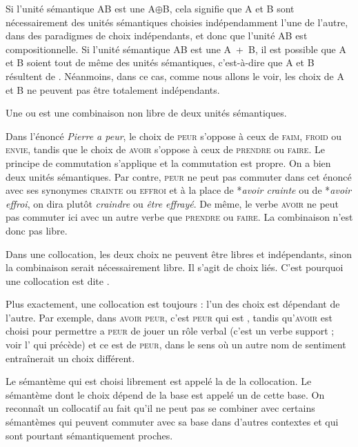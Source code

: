 Si l’unité sémantique AB est une  A${\oplus}$B, cela signifie que A et B sont nécessairement des unités sémantiques choisies indépendamment l’une de l’autre, dans des paradigmes de choix indépendants, et donc que l’unité AB est compositionnelle. Si l’unité sémantique AB est une  A~+~B, il est possible que A et B soient tout de même des unités sémantiques, c’est-à-dire que A et B résultent de . Néanmoins, dans ce cas, comme nous allons le voir, les choix de A et B ne peuvent pas être totalement indépendants.

{Une  ou  est une combinaison non libre de deux unités sémantiques.}

Dans l’énoncé \textit{Pierre a peur}, le choix de \textsc{peur} s’oppose à ceux de \textsc{faim,} \textsc{froid} ou \textsc{envie}, tandis que le choix de \textsc{avoir} s’oppose à ceux de \textsc{prendre} ou \textsc{faire}. Le principe de commutation s’applique et la commutation est propre. On a bien deux unités sémantiques. Par contre, \textsc{peur} ne peut pas commuter dans cet énoncé avec ses synonymes \textsc{crainte} ou \textsc{effroi} et à la place de *\textit{avoir crainte} ou de *\textit{avoir effroi}, on dira plutôt \textit{craindre} ou \textit{être effrayé}. De même, le verbe \textsc{avoir} ne peut pas commuter ici avec un autre verbe que \textsc{prendre} ou \textsc{faire}. La combinaison n’est donc pas libre.

{Dans une collocation, les deux choix ne peuvent être libres et indépendants, sinon la combinaison serait nécessairement libre. Il s’agit de choix liés. C’est pourquoi une collocation est dite .}

Plus exactement, une collocation est toujours : l’un des choix est dépendant de l’autre. Par exemple, dans \textsc{avoir} \textsc{peur}, c’est \textsc{peur} qui est , tandis qu’\textsc{avoir} est choisi pour permettre a \textsc{peur} de jouer un rôle verbal (c’est un verbe support ; voir l’ qui précède) et ce  est  de \textsc{peur}, dans le sens où un autre nom de sentiment entraînerait un choix différent.

{Le sémantème qui est choisi librement est appelé la  de la collocation. Le sémantème dont le choix dépend de la base est appelé un  de cette base. On reconnaît un collocatif au fait qu’il ne peut pas se combiner avec certains sémantèmes qui peuvent commuter avec sa base dans d’autres contextes et qui sont pourtant sémantiquement proches.}


